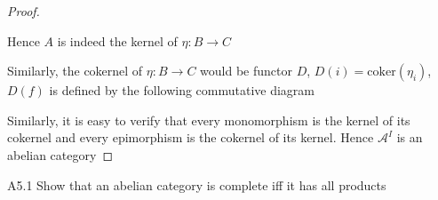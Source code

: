 \documentclass[../main.tex]{subfiles}
\begin{document}
\begin{proof}
\begin{center}
\end{center}
Hence $A$ is indeed the kernel of $\eta:B\to C$ \par
Similarly, the cokernel of $\eta:B\to C$ would be functor $D$, $D(i)=\mathrm{coker}(\eta_i)$, $D(f)$ is defined by the following  commutative diagram
\begin{center}
\end{center}
Similarly, it is easy to verify that every monomorphism is the kernel of its cokernel and every epimorphism is the cokernel of its kernel. Hence $\mathcal A^I$ is an abelian category
\end{proof}

\begin{customexercise}{A5.1}
Show that an abelian category is complete iff it has all products
\end{customexercise}
\end{document}
